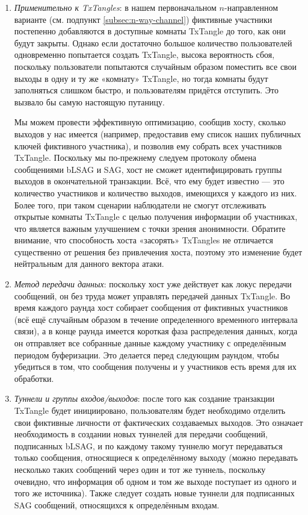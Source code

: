 \begin{enumerate}
    \item {\em Применительно к TxTangles}: в нашем первоначальном $n$-направленном варианте (см. подпункт \ref{subsec:n-way-channel}) фиктивные участники постепенно добавляются в доступные комнаты TxTangle до того, как они будут закрыты. Однако если достаточно большое количество пользователей одновременно попытается создать TxTangle, высока вероятность сбоя, поскольку пользователи попытаются случайным образом поместить все свои выходы в одну и ту же «комнату» TxTangle, но тогда комнаты будут заполняться слишком быстро, и пользователям придётся отступить. Это вызвало бы самую настоящую путаницу.

    Мы можем провести эффективную оптимизацию, сообщив хосту, сколько выходов у нас имеется (например, предоставив ему список наших публичных ключей фиктивного участника), и позволив ему собрать всех участников TxTangle. Поскольку мы по-прежнему следуем протоколу обмена сообщениями bLSAG и SAG, хост не сможет иден\-тифицировать группы выходов в окончательной транзакции. Всё, что ему будет извест\-но — это количество участников и количество выходов, имеющихся у каждого из них. Более того, при таком сценарии наблюдатели не смогут отслеживать открытые комнаты TxTangle с целью получения информации об участниках, что является важным улучше\-нием с точки зрения анонимности. Обратите внимание, что способность хоста «засо\-рять» TxTangles не отличается существенно от решения без привлечения хоста, поэтому это изменение будет нейтральным для данного вектора атаки.
    \item {\em Метод передачи данных}: поскольку хост уже действует как локус передачи сообщений, он без труда может управлять передачей данных TxTangle. Во время каждого раунда хост собирает сообщения от фиктивных участников (всё ещё случайным образом в течение определенного временного интервала связи), а в конце раунда имеется короткая фаза распределения данных, когда он отправляет все собранные данные каждому участ\-нику с определённым периодом буферизации. Это делается перед следующим раундом, чтобы убедиться в том, что сообщения получены и у участников есть время для их обработки.%
    \item {\em Туннели и группы входов/выходов}: после того как создание транзакции TxTangle будет инициировано, пользователям будет необходимо отделить свои фиктивные личности от фактических создаваемых выходов. Это означает необходимость в создании новых туннелей для передачи сообщений, подписанных bLSAG, и по каждому такому туннелю могут передаваться только сообщения, относящиеся к определённому выходу (можно передавать несколько таких сообщений через один и тот же туннель, поскольку очевидно, что информация об одном и том же выходе поступает из одного и того же источника). Также следует создать новые туннели для подписанных SAG сообщений, относящихся к определённым входам.

\end{enumerate}
